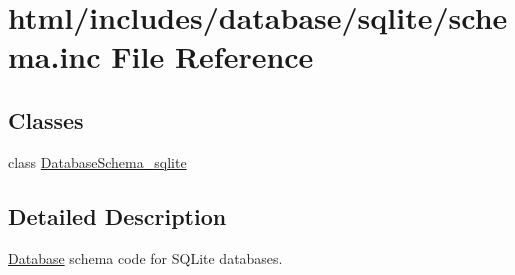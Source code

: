 \hypertarget{sqlite_2schema_8inc}{
\section{html/includes/database/sqlite/schema.inc File Reference}
\label{sqlite_2schema_8inc}
}
\subsection*{Classes}
\begin{DoxyCompactItemize}
\item 
class \hyperlink{classDatabaseSchema__sqlite}{DatabaseSchema\_\-sqlite}
\end{DoxyCompactItemize}


\subsection{Detailed Description}
\hyperlink{classDatabase}{Database} schema code for SQLite databases. 
